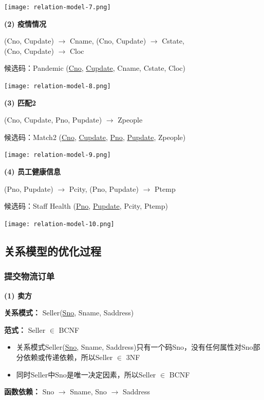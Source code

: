 \documentclass[12pt]{article}
\begin{document}
\begin{center}
	\texttt{[image: relation-model-7.png]}
\end{center}

\noindent \textbf{(2) 疫情情况} \par 
\noindent (Cno, Cupdate) $\rightarrow$ Cname, (Cno, Cupdate) $\rightarrow$ Cstate,\\ \noindent (Cno, Cupdate) $\rightarrow$ Cloc \par
\noindent 候选码：Pandemic (\uline{Cno}, \uline{Cupdate}, Cname, Cstate, Cloc)

\begin{center}
	\texttt{[image: relation-model-8.png]}
\end{center}

\noindent \textbf{(3) 匹配2} \par 
\noindent (Cno, Cupdate, Pno, Pupdate) $\rightarrow$ Zpeople \par
\noindent 候选码：Match2 (\uline{Cno}, \uline{Cupdate}, \uline{Pno}, \uline{Pupdate}, Zpeople)

\begin{center}
	\texttt{[image: relation-model-9.png]}
\end{center}

\noindent \textbf{(4) 员工健康信息} \par 
\noindent (Pno, Pupdate) $\rightarrow$ Pcity, (Pno, Pupdate) $\rightarrow$ Ptemp \par
\noindent 候选码：Staff Health (\uline{Pno}, \uline{Pupdate}, Pcity, Ptemp)

\begin{center}
	\texttt{[image: relation-model-10.png]}
\end{center}


\subsection{关系模型的优化过程}

\subsubsection{提交物流订单}

\noindent \textbf{(1) 卖方} \par 
\noindent \textbf{关系模式：} Seller(\uline{Sno}, Sname, Saddress) \par 
\noindent \textbf{范式：} Seller $\in$ BCNF \par 
\begin{itemize}
	\item 关系模式Seller(\uline{Sno}, Sname, Saddress)只有一个码Sno，没有任何属性对Sno部分依赖或传递依赖，所以Seller $\in$ 3NF
	\item 同时Seller中Sno是唯一决定因素，所以Seller $\in$ BCNF
\end{itemize}
\textbf{函数依赖：} Sno $\rightarrow$ Sname, Sno $\rightarrow$ Saddress
\end{document}
